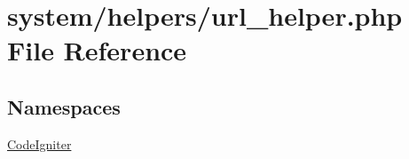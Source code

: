 \hypertarget{url__helper_8php}{}\section{system/helpers/url\+\_\+helper.php File Reference}
\label{url__helper_8php}
\subsection*{Namespaces}
\begin{DoxyCompactItemize}
\item 
 \mbox{\hyperlink{namespace_code_igniter}{Code\+Igniter}}
\end{DoxyCompactItemize}
